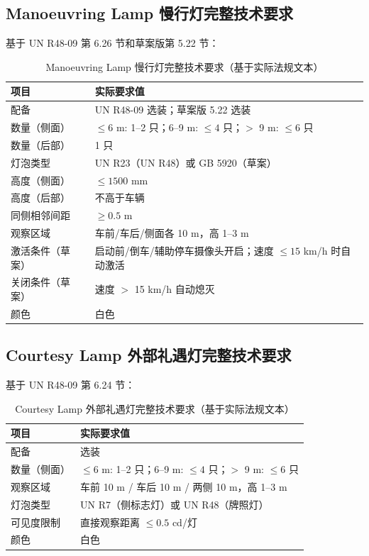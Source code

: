 \subsection{Manoeuvring Lamp 慢行灯完整技术要求}

基于 UN R48-09 第 6.26 节和草案版第 5.22 节：

\begin{table}[H]
\centering
\caption{Manoeuvring Lamp 慢行灯完整技术要求（基于实际法规文本）}
\small
\begin{tabularx}{\textwidth}{|X|X|}
\hline
\textbf{项目} & \textbf{实际要求值} \\
\hline
配备 & UN R48-09 选装；草案版 5.22 选装 \\
\hline
数量（侧面）& $\le 6$ m: 1--2 只；6--9 m: $\le 4$ 只；$>$ 9 m: $\le 6$ 只 \\
\hline
数量（后部）& 1 只 \\
\hline
灯泡类型 & UN R23（UN R48）或 GB 5920（草案）\\
\hline
高度（侧面）& $\le 1500$ mm \\
\hline
高度（后部）& 不高于车辆 \\
\hline
同侧相邻间距 & $\ge 0.5$ m \\
\hline
观察区域 & 车前/车后/侧面各 10 m，高 1--3 m \\
\hline
激活条件（草案）& 启动前/倒车/辅助停车摄像头开启；速度 $\le 15$ km/h 时自动激活 \\
\hline
关闭条件（草案）& 速度 $>$ 15 km/h 自动熄灭 \\
\hline
颜色 & 白色 \\
\hline
\end{tabularx}
\end{table}

\subsection{Courtesy Lamp 外部礼遇灯完整技术要求}

基于 UN R48-09 第 6.24 节：

\begin{table}[H]
\centering
\caption{Courtesy Lamp 外部礼遇灯完整技术要求（基于实际法规文本）}
\small
\begin{tabularx}{\textwidth}{|X|X|}
\hline
\textbf{项目} & \textbf{实际要求值} \\
\hline
配备 & 选装 \\
\hline
数量（侧面）& $\le 6$ m: 1--2 只；6--9 m: $\le 4$ 只；$>$ 9 m: $\le 6$ 只 \\
\hline
观察区域 & 车前 10 m / 车后 10 m / 两侧 10 m，高 1--3 m \\
\hline
灯泡类型 & UN R7（侧标志灯）或 UN R48（牌照灯）\\
\hline
可见度限制 & 直接观察距离 $\le 0.5$ cd/灯 \\
\hline
颜色 & 白色 \\
\hline
\end{tabularx}
\end{table}

